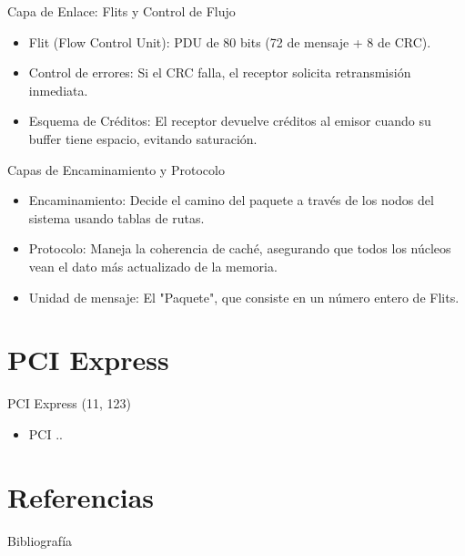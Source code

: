 \documentclass[presentation]{beamer}
\begin{document}
\begin{frame}[label={sec:org9967e59}]{Capa de Enlace: Flits y Control de Flujo}
\begin{itemize}
\item \alert{\alert{Flit (Flow Control Unit):}} PDU de 80 bits (72 de mensaje + 8 de CRC).
\item \alert{\alert{Control de errores:}} Si el CRC falla, el receptor solicita retransmisión inmediata.
\item \alert{\alert{Esquema de Créditos:}} El receptor devuelve créditos al emisor cuando su buffer tiene espacio, evitando saturación.
\end{itemize}
\end{frame}

\begin{frame}[label={sec:org6987ae7}]{Capas de Encaminamiento y Protocolo}
\begin{itemize}
\item \alert{\alert{Encaminamiento:}} Decide el camino del paquete a través de los nodos del sistema usando tablas de rutas.
\item \alert{\alert{Protocolo:}} Maneja la coherencia de caché, asegurando que todos los núcleos vean el dato más actualizado de la memoria.
\item \alert{\alert{Unidad de mensaje:}} El "Paquete", que consiste en un número entero de Flits.
\end{itemize}
\end{frame}

\section{PCI Express}
\label{sec:org40921d7}
\begin{frame}[label={sec:orga47fca4}]{PCI Express (11, 123)}
\begin{itemize}
\item PCI ..
\end{itemize}
\end{frame}
\section{Referencias}
\label{sec:org723c9e8}
\begin{frame}[allowframebreaks]{Bibliografía}
\printbibliography
\end{frame}
\end{document}
